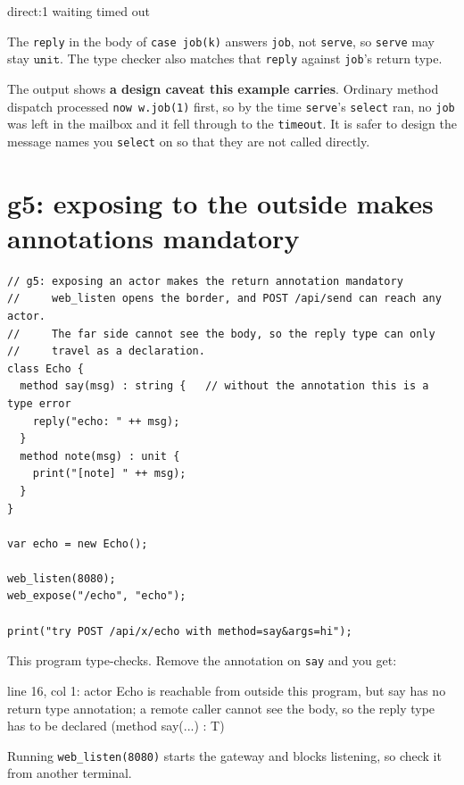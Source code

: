 \documentclass[11pt,a4paper]{article}
\newcommand{\ty}[1]{\ensuremath{\mathtt{#1}}}
\begin{document}
\begin{term}
direct:1
waiting
timed out
\end{term}

The \texttt{reply} in the body of \texttt{case job(k)} answers \texttt{job},
not \texttt{serve}, so \texttt{serve} may stay \ty{unit}. The type checker also
matches that \texttt{reply} against \texttt{job}'s return type.

The output shows \textbf{a design caveat this example carries}. Ordinary method
dispatch processed \texttt{now w.job(1)} first, so by the time \texttt{serve}'s
\texttt{select} ran, no \texttt{job} was left in the mailbox and it fell
through to the \texttt{timeout}. It is safer to design the message names you
\texttt{select} on so that they are not called directly.

\section{g5: exposing to the outside makes annotations mandatory}

\begin{lstlisting}
// g5: exposing an actor makes the return annotation mandatory
//     web_listen opens the border, and POST /api/send can reach any actor.
//     The far side cannot see the body, so the reply type can only
//     travel as a declaration.
class Echo {
  method say(msg) : string {   // without the annotation this is a type error
    reply("echo: " ++ msg);
  }
  method note(msg) : unit {
    print("[note] " ++ msg);
  }
}

var echo = new Echo();

web_listen(8080);
web_expose("/echo", "echo");

print("try POST /api/x/echo with method=say&args=hi");
\end{lstlisting}

This program type-checks. Remove the annotation on \texttt{say} and you get:

\begin{term}
 line 16, col 1: actor Echo is reachable from outside this
  program, but say has no return type annotation; a remote caller cannot
  see the body, so the reply type has to be declared (method say(...) : T)
\end{term}

Running \texttt{web\_listen(8080)} starts the gateway and blocks listening, so
check it from another terminal.

\end{document}
